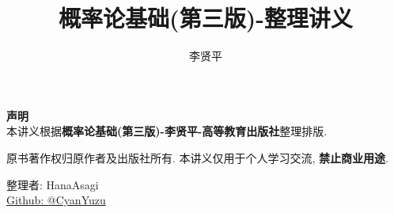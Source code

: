 \documentclass[lang=cn,11pt,blue,thmcnt=section]{elegantbook}
\title{概率论基础(第三版)-整理讲义}
\author{李贤平}
\institute{高等教育出版社}
\begin{document}
\maketitle

\newpage

\setcounter{page}{1}

\vspace*{\fill}

\begin{center}
    \textbf{声明} \\
    本讲义根据\textbf{概率论基础(第三版)-李贤平-高等教育出版社}整理排版. 

    原书著作权归原作者及出版社所有. 
    本讲义仅用于个人学习交流, \textbf{禁止商业用途}. 

    \vspace{1em}
    整理者: HanaAsagi \\
    \href{https://github.com/CyanYuzu}{Github: @CyanYuzu}
\end{center}

\vspace*{\fill}

\tableofcontents

\newpage

\setcounter{page}{1}


\end{document}

